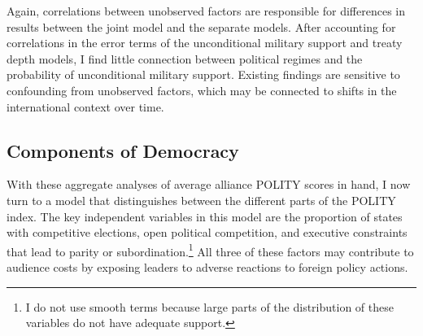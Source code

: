 \documentclass[12pt]{article}
\begin{document}
Again, correlations between unobserved factors are responsible for differences in results between the joint model and the separate models. 
After accounting for correlations in the error terms of the unconditional military support and treaty depth models, I find little connection between political regimes and the probability of unconditional military support. 
Existing findings are sensitive to confounding from unobserved factors, which may be connected to shifts in the international context over time. 

\subsection{Components of Democracy}

With these aggregate analyses of average alliance POLITY scores in hand, I now turn to a model that distinguishes between the different parts of the POLITY index. 
The key independent variables in this model are the proportion of states with competitive elections, open political competition, and executive constraints that lead to parity or subordination.\footnote{I do not use smooth terms because large parts of the distribution of these variables do not have adequate support.}
All three of these factors may contribute to audience costs by exposing leaders to adverse reactions to foreign policy actions. 
\end{document}
